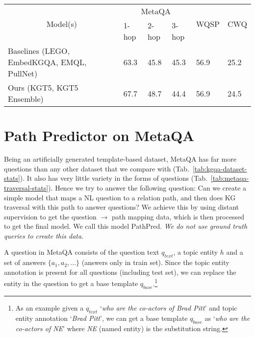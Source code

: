 \documentclass[11pt]{article}
\renewcommand\:{\colon} \newcommand{\sset}[1]{\left\{\,#1\,\right\}} \newcommand{\ssets}[1]{\left\{#1\right\}} \newcommand{\ssetn}[1]{\{\,#1\,\}}
\newcommand{\method}{\textsc{KGT5}}
\begin{document}
\begin{table*}[t!]
\centering
\begin{tabular}{@{}llllll@{}}
\toprule
\multicolumn{1}{c}{\multirow{2}{*}{Model(s)}} & \multicolumn{3}{c}{MetaQA} & \multirow{2}{*}{WQSP} & \multirow{2}{*}{CWQ} \\
\multicolumn{1}{c}{}                          & 1-hop   & 2-hop   & 3-hop  &                       &                      \\ \midrule
Baselines (LEGO, EmbedKGQA, EMQL, PullNet)    & 63.3    & 45.8    & 45.3   & 56.9                  & 25.2                 \\
Ours (\method{}, \method{} Ensemble)                   & 67.7    & 48.7    & 44.4   & 56.9                  & 24.5                 \\ \bottomrule
\end{tabular}
\caption{Percentage of questions answerable using ground truth query. For the baselines that we compare with, we do not have access to the exact same 50\% KG split used by them. This table lists the percentage of questions answerable using GT query, for the KGs used by the comparison models (LEGO, EmbedKGQA, EMQL, PullNet) as well as by our models (\method{}, \method{} + PathPred Ensemble). The GT query numbers for baselines were made available by \citealt{ren2021lego}.} 
\label{tab:kg-traversal-stats}
\end{table*} 

\section{Path Predictor on MetaQA}
\label{sec:kg_traversal_on_metaqa}

Being an artificially generated template-based dataset, MetaQA has far more questions than any other dataset that we compare with (Tab.~\ref{tab:kgqa-dataset-stats}). It also has very little variety in the forms of questions (Tab.~\ref{tab:metaqa-traversal-stats}). Hence we try to answer the following question: Can we create a simple model that maps a NL question to a relation path, and then does KG traversal with this path to answer questions? We achieve this by using distant supervision to get the question $\rightarrow$ path mapping data, which is then processed to get the final model. We call this model PathPred.
\textit{We do not use ground truth queries to create this data}.

A question in MetaQA consists of the question text $q_{text}$, a topic entity $h$ and a set of answers $\{a_1, a_2,...\}$ (answers only in train set). Since the topic entity annotation is present for all questions (including test set), we can replace the entity in the question to get a base template $q_{base}$.\footnote{As an example given a $q_{text}$ `\textit{who are the co-actors of Brad Pitt}' and topic entity annotation `\textit{Brad Pitt}', we can get a base template $q_{base}$ as `\textit{who are the co-actors of NE}' where \textit{NE} (named entity) is the substitution string.}
\end{document}
